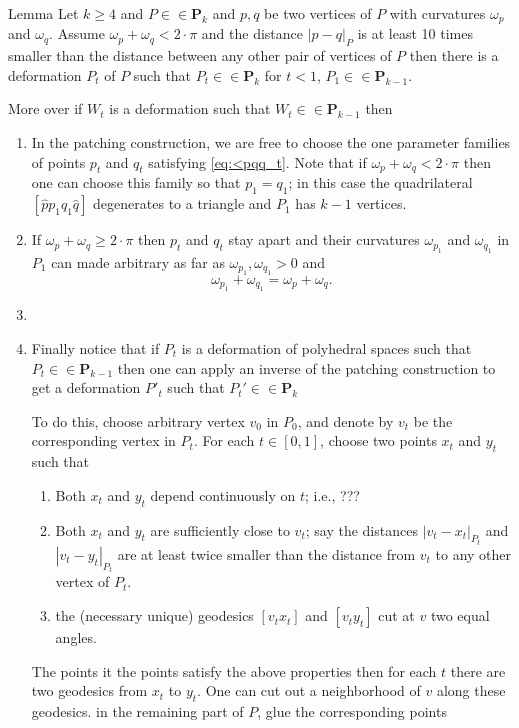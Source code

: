 \begin{thm}{Lemma}
Let $k\ge 4$ and $P\in\in \mathbf{P}_k$ and $p,q$ be two vertices of $P$ with curvatures $\omega_p$ and $\omega_q$.
Assume $\omega_p+\omega_q<2\cdot\pi$ and 
the distance $|p-q|_P$ is at least 10 times smaller than the distance between any other pair of vertices of $P$
then there is a deformation $P_t$ of $P$ such that
$P_t\in\in\mathbf{P}_k$ for $t<1$,
$P_1\in\in\mathbf{P}_{k-1}$.

More over if $W_t$ is a deformation 
such that $W_t\in\in \mathbf{P}_{k-1}$ 
then 
\end{thm}




\begin{enumerate}
\item\label{obs:k-1} In the patching construction, we are free to choose the one parameter families of points $p_t$ and $q_t$ satisfying \ref{eq:<pqq_t}.
Note that if $\omega_p+\omega_q<2\cdot \pi$
then one can choose this family so that $p_1=q_1$;
in this case the quadrilateral $[\hat p p_1 q_1 \hat q]$
degenerates to a triangle and $P_1$ has $k-1$ vertices.

\item\label{obs:curvature} If $\omega_p+\omega_q\ge 2\cdot \pi$ then $p_t$ and $q_t$ stay apart and their curvatures 
$\omega_{p_1}$ and $\omega_{q_1}$ in $P_1$ 
can made arbitrary as far as $\omega_{p_1}, \omega_{q_1}>0$ and
$$
\omega_{p_1}+\omega_{q_1}
=
\omega_{p}+\omega_{q}.
$$ 
\item\label{obs:recursion} 

\item\label{obs:k}
Finally notice that if $P_t$ is a deformation of polyhedral spaces such that $P_t\in\in \mathbf{P}_{k-1}$
then one can apply an inverse of the patching construction to get a deformation $P'_t$ such that $P_t'\in\in \mathbf{P}_{k}$

To do this, choose arbitrary vertex $v_0$ in $P_0$,
and denote by $v_t$ be the corresponding vertex in $P_t$.
For each $t\in[0,1]$,
choose two points $x_t$ and $y_t$ such that
\begin{enumerate}
\item Both $x_t$ and $y_t$ depend continuously on $t$;
i.e., ???
\item Both $x_t$ and $y_t$
are sufficiently close to $v_t$;
say the distances $|v_t-x_t|_{P_t}$ and $|v_t-y_t|_{P_t}$ are at least twice smaller than the distance from $v_t$ to any other vertex of $P_t$.
\item the (necessary unique) geodesics 
$[v_tx_t]$ and $[v_ty_t]$ cut at $v$ two equal angles.   
\end{enumerate}
The points it the points satisfy the above properties then for each $t$ there are two geodesics from $x_t$ to $y_t$. 
One can cut out a neighborhood of $v$ 
along these geodesics.
in the remaining part of $P$,
glue the corresponding points 
\end{enumerate}
















